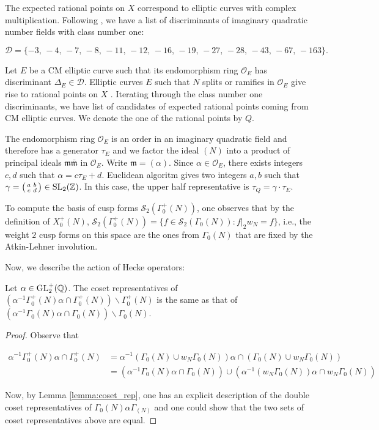 The expected rational points on $X$ correspond to elliptic curves with complex multiplication. Following \cite{Mercuri_2018,stark_classnumber1}, we have a list of discriminants of imaginary quadratic number fields with class number one:

\[
\mathcal{D} = \{ -3,\,-4,\,-7,\,-8,\,-11,\,-12,\,-16,\,-19,\,-27,\,-28,\,-43,\,-67,\,-163\}.
\]

Let $E$ be a CM elliptic curve such that its endomorphism ring $\mathcal{O}_E$ has discriminant $\Delta_E \in \mathcal{D}$. Elliptic curves $E$ such that $N$ splits or ramifies in $\mathcal{O}_E$ give rise to rational points on $X$ \cite{Galbraith_1999}. Iterating through the class number one discriminants, we have list of candidates of expected rational points coming from CM elliptic curves. We denote the one of the rational points by $Q$.

The endomorphism ring $\mathcal{O}_E$ is an order in an imaginary quadratic field and therefore has a generator $\tau_E$ and we factor the ideal $(N)$ into a product of principal ideals $\mathfrak{m}\bar{\mathfrak{m}}$ in $\mathcal{O}_E$. Write $\mathfrak{m} = (\alpha)$. Since $\alpha \in \mathcal{O}_E$, there exists integers $c,d$ such that $\alpha = c \tau_E + d$. Euclidean algoritm gives two integers $a,b$ such that $\gamma = \begin{psmallmatrix} a & b \\ c & d \end{psmallmatrix} \in \operatorname{SL}_2(\mathbb{Z})$. In this case, the upper half representative is $\tau_Q = \gamma \cdot \tau_E$.

To compute the basis of cusp forms $\mathcal{S}_2(\Gamma_0^+(N))$, one observes that by the definition of $X_0^+(N)$, $\mathcal{S}_2(\Gamma_0^+(N)) = \{ f \in \mathcal{S}_2(\Gamma_0(N)) : f|_2 w_N = f\}$, i.e., the weight $2$ cusp forms on this space are the ones from $\Gamma_0(N)$ that are fixed by the Atkin-Lehner involution.

Now, we describe the action of Hecke operators:

\begin{lemma}
Let $\alpha \in \operatorname{GL}_2^+(\mathbb{Q})$. The coset representatives of $(\alpha^{-1}\Gamma_0^+(N) \alpha \cap \Gamma_0^+(N))\backslash \Gamma_0^+(N)$ is the same as that of  $(\alpha^{-1}\Gamma_0(N) \alpha \cap \Gamma_0(N))\backslash \Gamma_0(N)$.
\end{lemma}

\begin{proof}
Observe that 

\begin{align*}
    \alpha^{-1}\Gamma_0^+(N)\alpha\cap \Gamma_0^+(N) &= \alpha^{-1}(\Gamma_0(N)\cup w_N\Gamma_0(N))\alpha \cap (\Gamma_0(N)\cup w_N\Gamma_0(N)) \\
    &= (\alpha^{-1}\Gamma_0(N)\alpha \cap \Gamma_0(N))\cup (\alpha^{-1}(w_N\Gamma_0(N))\alpha\cap w_N\Gamma_0(N))
\end{align*}

Now, by Lemma \ref{lemma:coset_rep}, one has an explicit description of the double coset representatives of $\Gamma_0(N)\alpha \Gamma_(N)$ and one could show that the two sets of coset representatives above are equal.
\end{proof}

